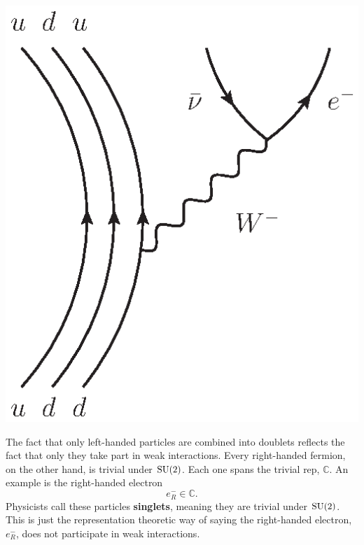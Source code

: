 \documentclass{article}
\newcommand{\C}{{\mathbb C}}  %
\newcommand{\SU}{{\rm SU}}    %
\begin{document}
\begin{center}
	\includegraphics[scale=0.75]{betadecay}
\end{center}

The fact that only left-handed particles are combined into doublets reflects
the fact that only they take part in weak interactions. Every right-handed
fermion, on the other hand, is trivial under $\SU(2)$. Each one spans the
trivial rep, $\C$.  An example is the right-handed electron 
\[              e^-_R \in \C  .\]
Physicists call these particles \textbf{singlets}, meaning they are 
trivial under $\SU(2)$. This is just the representation theoretic way of 
saying the right-handed electron, $e^-_R$, does not participate in weak 
interactions.
\end{document}

